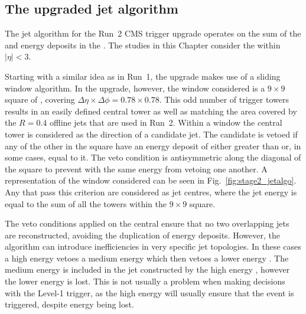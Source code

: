 \subsection{The upgraded jet algorithm}
\label{sec:stage2_jetalgo}

The jet algorithm for the Run~2 CMS trigger upgrade operates on
the sum of the \ECAL and \HCAL energy deposits in the \TTs. The studies
in this Chapter consider the \TTs within $|\eta|<3$.

Starting with a similar idea as in Run~1, the upgrade makes use of a
sliding window algorithm. In the upgrade, however, the window
considered is a $9\times9$ square of \TTs, covering
$\Delta\eta\times\Delta\phi = 0.78 \times 0.78$. This odd number of
trigger towers results in an easily defined central tower as well as
matching the area covered by the $R=0.4$ offline jets that are used in
Run~2. Within a window the central tower is considered as the
direction of a candidate jet. The candidate is vetoed if any of the
other \TTs in the square have an energy deposit of either greater than
or, in some cases, equal to it. The veto condition is
antisymmetric along the diagonal of the square to prevent \TTs with the
same energy from vetoing one another. A representation of the window
considered can be seen in Fig.~\ref{fig:stage2_jetalgo}.  Any \TTs that
pass this criterion are considered as jet centres, where the jet energy
is equal to the sum of all the towers within the $9\times9$ square.

The veto conditions applied on the central \TT ensure that no two
overlapping jets are reconstructed, avoiding the duplication of energy
deposits. However, the algorithm can introduce inefficiencies in very
specific jet topologies. In these cases a high energy \TT vetoes a
medium energy \TT which then vetoes a lower energy \TT. 
The medium energy \TT is included in the jet constructed by the high energy
\TT, however the lower energy \TT is lost. This is not usually a
problem when making decisions with the Level-1 trigger, as the high
energy \TT will usually ensure that the event is triggered, despite
energy being lost.

